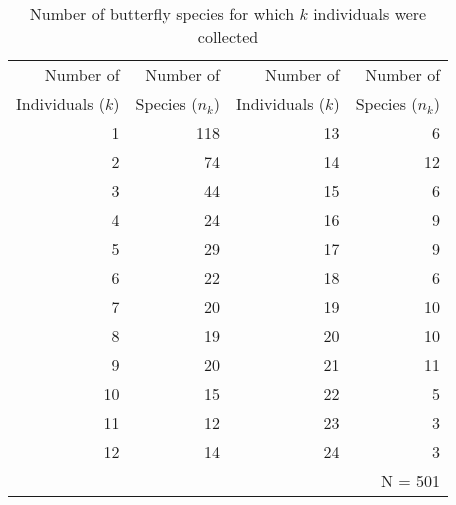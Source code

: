 \begin{table}[htb]
{
\small
\caption{Number of butterfly species for which $k$ individuals were collected}
\label{tab:butterfly}
 \begin{center}
  \begin{tabular}{rr|rr}
  \hline
Number of & Number of & Number of & Number of \\
Individuals ($k$)& Species ($n_k$) & Individuals ($k$)& Species ($n_k$)\\
  \hline
1 & 118 & 13 & 6 \\
2 & 74 & 14 & 12 \\
3 & 44 & 15 & 6 \\
4 & 24 & 16 & 9 \\
5 & 29 & 17 & 9 \\
6 & 22 & 18 & 6 \\
7 & 20 & 19 & 10 \\
8 & 19 & 20 & 10 \\
9 & 20 & 21 & 11 \\
10 & 15 & 22 & 5 \\
11 & 12 & 23 & 3 \\
12 & 14 & 24 & 3 \\
    & &   & N = 501 \\ 
  \hline
  \end{tabular}
 \end{center}
}
\end{table}

